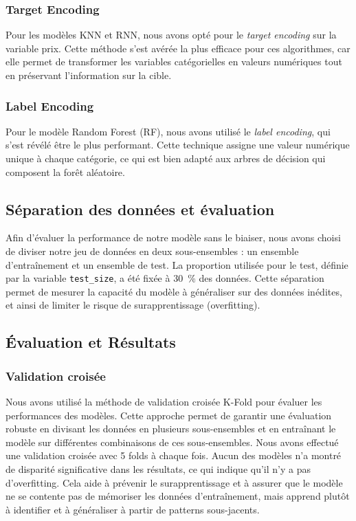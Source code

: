 \documentclass[12pt]{report}
\begin{document}
\subsubsection{Target Encoding}

Pour les modèles KNN et RNN, nous avons opté pour le \textit{target encoding} sur la variable prix. Cette méthode s'est avérée la plus efficace pour ces algorithmes, car elle permet de transformer les variables catégorielles en valeurs numériques tout en préservant l'information sur la cible.

\subsubsection{Label Encoding}

Pour le modèle Random Forest (RF), nous avons utilisé le \textit{label encoding}, qui s'est révélé être le plus performant. Cette technique assigne une valeur numérique unique à chaque catégorie, ce qui est bien adapté aux arbres de décision qui composent la forêt aléatoire.

\subsection{Séparation des données et évaluation} 

Afin d’évaluer la performance de notre modèle sans le biaiser, nous avons choisi de diviser notre jeu de données en deux sous-ensembles : un ensemble d’entraînement et un ensemble de test. La proportion utilisée pour le test, définie par la variable \texttt{test\_size}, a été fixée à 30~\% des données. Cette séparation permet de mesurer la capacité du modèle à généraliser sur des données inédites, et ainsi de limiter le risque de surapprentissage (overfitting).


\subsection{Évaluation et Résultats}

\subsubsection{Validation croisée}

Nous avons utilisé la méthode de validation croisée K-Fold pour évaluer les performances des modèles. Cette approche permet de garantir une évaluation robuste en divisant les données en plusieurs sous-ensembles et en entraînant le modèle sur différentes combinaisons de ces sous-ensembles. Nous avons effectué une validation croisée avec 5 folds à chaque fois. Aucun des modèles n'a montré de disparité significative dans les résultats, ce qui indique qu'il n'y a pas d'overfitting. Cela aide à prévenir le surapprentissage et à assurer que le modèle ne
se contente pas de mémoriser les données d'entraînement, mais apprend plutôt à identifier
et à généraliser à partir de patterns sous-jacents.
\end{document}
